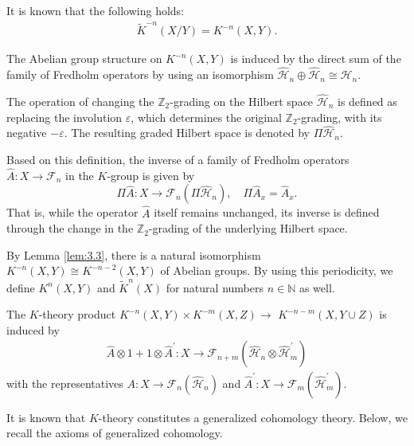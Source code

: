 \documentclass{amsart}
\theoremstyle{definition}
\theoremstyle{remark}
\begin{document}
It is known that the following holds:
\begin{align*}
\tilde{K}^{-n}(X/Y)=K^{-n}(X, Y).
\end{align*}

The Abelian group structure on $K^{-n}(X, Y)$ is induced by the direct sum of the family of Fredholm operators by using an isomorphism 
$\hat{\mathcal{H}}_n\oplus \hat{\mathcal{H}}_n \cong \hat{\mathcal{H}}_n$.

The operation of changing the $\mathbb{Z}_2$-grading on the Hilbert space $\hat{\mathcal{H}}_n$ is defined as replacing the involution $\varepsilon$, which determines the original $\mathbb{Z}_2$-grading, with its negative $-\varepsilon$. The resulting graded Hilbert space is denoted by $\Pi \hat{\mathcal{H}}_n$.

Based on this definition, the inverse of a family of Fredholm operators $\hat{A} \colon X \to \mathcal{F}_n$ in the $K$-group is given by
\[
\Pi \hat{A} \colon X \to \mathcal{F}_n(\Pi \hat{\mathcal{H}}_n), \quad \Pi \hat{A}_x = \hat{A}_x.
\]
That is, while the operator $\hat{A}$ itself remains unchanged, its inverse is defined through the change in the $\mathbb{Z}_2$-grading of the underlying Hilbert space.


By Lemma \ref{lem:3.3}, there is a natural isomorphism $K^{-n}(X,Y)\cong K^{-n-2}(X, Y)$ of Abelian groups. By using this periodicity, we define \(K^n(X, Y)\) and \(\tilde{K}^n(X)\) for natural numbers \(n \in \mathbb{N}\) as well.

The $K$-theory product $K^{-n}(X, Y)\times K^{-m}(X, Z)\to$ $K^{-n-m}(X, Y \cup Z)$ is induced by 
\begin{align*}
\hat{A} \otimes 1+1 \otimes \hat{A}^{\prime} \colon X \to \mathcal{F}_{n+m}(\mathcal{\hat{H}}_n \otimes \mathcal{\hat{H}}^{\prime}_m)
\end{align*}
with the representatives $A \colon X \to \mathcal{F}_n(\mathcal{\hat{H}}_n)$ and $\hat{A}^{\prime} \colon X \to \mathcal{F}_m(\mathcal{\hat{H}}^{\prime}_m).$

It is known that $K$-theory constitutes a generalized cohomology theory. Below, we recall the axioms of generalized cohomology.
\end{document}
